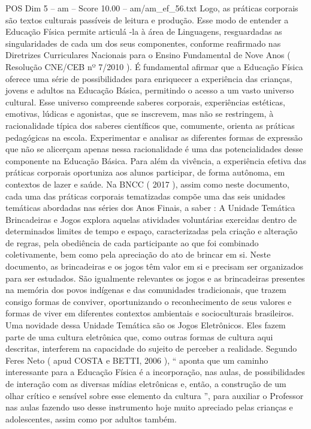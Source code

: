 \begin{textsample}{POS Dim 5 – am – Score 10.00 – am/am\_ef\_56.txt}
Logo, as práticas corporais são textos culturais passíveis de leitura e produção.
Esse modo de entender a Educação Física permite articulá -la à área de Linguagens, resguardadas as singularidades de cada um dos seus componentes, conforme reafirmado nas Diretrizes Curriculares Nacionais para o Ensino Fundamental de Nove Anos ( Resolução CNE/CEB nº 7/2010 ).
É fundamental afirmar que a Educação Física oferece uma série de possibilidades para enriquecer a experiência das crianças, jovens e adultos na Educação Básica, permitindo o acesso a um vasto universo cultural.
Esse universo compreende saberes corporais, experiências estéticas, emotivas, lúdicas e agonistas, que se inscrevem, mas não se restringem, à racionalidade típica dos saberes científicos que, comumente, orienta as práticas pedagógicas na escola.
Experimentar e analisar as diferentes formas de expressão que não se alicerçam apenas nessa racionalidade é uma das potencialidades desse componente na Educação Básica.
Para além da vivência, a experiência efetiva das práticas corporais oportuniza aos alunos participar, de forma autônoma, em contextos de lazer e saúde.
Na BNCC ( 2017 ), assim como neste documento, cada uma das práticas corporais tematizadas compõe uma das seis unidades temáticas abordadas nas séries dos Anos Finais, a saber : A Unidade Temática Brincadeiras e Jogos explora aquelas atividades voluntárias exercidas dentro de determinados limites de tempo e espaço, caracterizadas pela criação e alteração de regras, pela obediência de cada participante ao que foi combinado coletivamente, bem como pela apreciação do ato de brincar em si.
Neste documento, as brincadeiras e os jogos têm valor em si e precisam ser organizados para ser estudados.
São igualmente relevantes os jogos e as brincadeiras presentes na memória dos povos indígenas e das comunidades tradicionais, que trazem consigo formas de conviver, oportunizando o reconhecimento de seus valores e formas de viver em diferentes contextos ambientais e socioculturais brasileiros.
Uma novidade dessa Unidade Temática são os Jogos Eletrônicos.
Eles fazem parte de uma cultura eletrônica que, como outras formas de cultura aqui descritas, interferem na capacidade do sujeito de perceber a realidade.
Segundo Feres Neto ( apud COSTA e BETTI, 2006 ), “ aponta que um caminho interessante para a Educação Física é a incorporação, nas aulas, de possibilidades de interação com as diversas mídias eletrônicas e, então, a construção de um olhar crítico e sensível sobre esse elemento da cultura ”, para auxiliar o Professor nas aulas fazendo uso desse instrumento hoje muito apreciado pelas crianças e adolescentes, assim como por adultos também.

\end{textsample}
